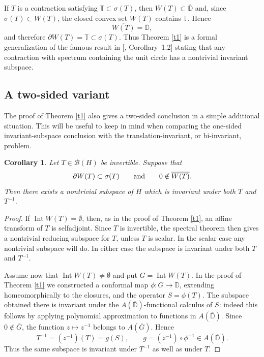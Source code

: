 \documentclass[11pt]{amsart}
\makeatletter
\numberwithin{equation}{section}
\newtheorem{corollary}[theorem]{Corollary}
\theoremstyle{definition}
\theoremstyle{remark}
\newcommand{\loccite}[2]{[\@ifundefined{b@#2}{\textbf{??}}{\csname b@#2\endcsname}, #1]}
\DeclareMathOperator{\Int}{Int}
\newcommand{\TT}{\mathbb{T}}
\newcommand{\DD}{\mathbb{D}}
\newcommand{\BH}{\mathcal B(H)}
\makeatother
\begin{document}
If $T$ is a contraction satisfying $\TT\subset\sigma(T)$, then $W(T)\subset\overline{\DD}$ and, since $\sigma(T)\subset\overline{W(T)}$, the closed convex set $\overline{W(T)}$ contains $\TT$. Hence
$$
\overline{W(T)}=\overline{\DD},
$$
and therefore $\partial W(T)=\TT\subset\sigma(T)$. Thus Theorem \ref{t1} is a formal generalization of the famous result in \loccite{Corollary~1.2}{BChP} stating that any contraction with spectrum containing the unit circle has a nontrivial invariant subspace.




\subsection{A two-sided variant}
\label{subsec:two-sided-variant}

The proof of Theorem \ref{t1} also gives a two-sided conclusion in a simple
additional situation. This will be useful to keep in mind when comparing the
one-sided invariant-subspace conclusion with the translation-invariant, or
bi-invariant, problem.

\begin{corollary}\label{cor:two-sided-zero-away}
Let $T\in\BH$ be invertible. Suppose that
\[
    \partial W(T)\subset \sigma(T)
    \qquad\hbox{and}\qquad
    0\notin \overline{W(T)} .
\]
Then there exists a nontrivial subspace of $H$ which is invariant under
both $T$ and $T^{-1}$.
\end{corollary}

\begin{proof}
If $\Int W(T)=\emptyset$, then, as in the proof of Theorem \ref{t1}, an affine
transform of $T$ is selfadjoint. Since $T$ is invertible, the spectral theorem
then gives a nontrivial reducing subspace for $T$, unless $T$ is scalar. In the
scalar case any nontrivial subspace will do. In either case the subspace
is invariant under both $T$ and $T^{-1}$.

Assume now that $\Int W(T)\ne\emptyset$ and put $G=\Int W(T)$. In the proof of
Theorem \ref{t1} we constructed a conformal map
$\phi:G\to\mathbb D$, extending homeomorphically to the closures, and the
operator $S=\phi(T)$. The subspace obtained there is invariant under the
$A(\overline{\mathbb D})$-functional calculus of $S$: indeed this follows by applying
polynomial approximation to functions in $A(\overline{\mathbb D})$. Since $0\notin\overline{G}$, the
function $z\mapsto z^{-1}$ belongs to $A(\overline G)$. Hence
\[
    T^{-1}=(z^{-1})(T)=g(S),
    \qquad
    g=(z^{-1})\circ\phi^{-1}\in A(\overline{\mathbb D}).
\]
Thus the same subspace is invariant under $T^{-1}$ as well as under $T$.
\end{proof}
\end{document}
